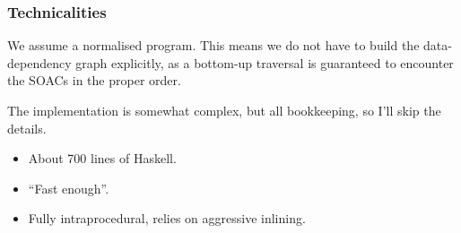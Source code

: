 \documentclass{beamer}
\begin{document}
\begin{frame}[fragile,t]
  \frametitle{Technicalities}

  We assume a normalised program.  This means we do not have to build
  the data-dependency graph explicitly, as a bottom-up traversal is
  guaranteed to encounter the SOACs in the proper order.

  The implementation is somewhat complex, but all bookkeeping, so I'll
  skip the details.

  \begin{itemize}
    \item About 700 lines of Haskell.
    \item ``Fast enough''.
    \item Fully intraprocedural, relies on aggressive inlining.
  \end{itemize}
\end{frame}
\end{document}
